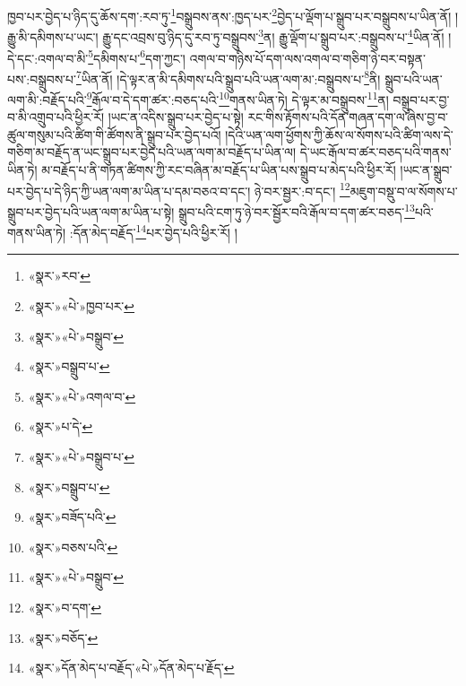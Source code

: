 ཁྱབ་པར་བྱེད་པ་ཉིད་དུ་ཆོས་དག་:རབ་ཏུ་\footnote{«སྣར་»རབ་}བསྒྲུབས་ནས་:ཁྱད་པར་\footnote{«སྣར་»«པེ་»ཁྱབ་པར་}བྱེད་པ་ལྡོག་པ་སྒྲུབ་པར་བསྒྲུབས་པ་ཡིན་ནོ། །རྒྱུ་མི་དམིགས་པ་ཡང་། རྒྱུ་དང་འབྲས་བུ་ཉིད་དུ་རབ་ཏུ་བསྒྲུབས་\footnote{«སྣར་»«པེ་»བསྒྲུབ་}ན། རྒྱུ་ལྡོག་པ་སྒྲུབ་པར་:བསྒྲུབས་པ་\footnote{«སྣར་»བསྒྲུབ་པ་}ཡིན་ནོ། །དེ་དང་:འགལ་བ་མི་\footnote{«སྣར་»«པེ་»འགལ་བ་}དམིགས་པ་\footnote{«སྣར་»པ་དེ་}དག་ཀྱང་། འགལ་བ་གཉིས་པོ་དག་ལས་འགལ་བ་གཅིག་ཉེ་བར་བསྟན་པས་:བསྒྲུབས་པ་\footnote{«སྣར་»«པེ་»བསྒྲུབ་པ་}ཡིན་ནོ། །དེ་ལྟར་ན་མི་དམིགས་པའི་སྒྲུབ་པའི་ཡན་ལག་མ་:བསྒྲུབས་པ་\footnote{«སྣར་»བསྒྲུབ་པ་}ནི། སྒྲུབ་པའི་ཡན་ལག་མི་:བརྗོད་པའི་\footnote{«སྣར་»བཟོད་པའི་}རྒོལ་བ་དེ་དག་ཚར་:བཅད་པའི་\footnote{«སྣར་»བཅས་པའི་}གནས་ཡིན་ཏེ། དེ་ལྟར་མ་བསྒྲུབས་\footnote{«སྣར་»«པེ་»བསྒྲུབ་}ན། བསྒྲུབ་པར་བྱ་བ་མི་འགྲུབ་པའི་ཕྱིར་རོ། །ཡང་ན་འདིས་སྒྲུབ་པར་བྱེད་པ་སྟེ། རང་གིས་རྟོགས་པའི་དོན་གཞན་དག་ལ་ཞེས་བྱ་བ་ཚུལ་གསུམ་པའི་ཚིག་གི་ཚོགས་ནི་སྒྲུབ་པར་བྱེད་པའོ། །དེའི་ཡན་ལག་ཕྱོགས་ཀྱི་ཆོས་ལ་སོགས་པའི་ཚིག་ལས་དེ་གཅིག་མ་བརྗོད་ན་ཡང་སྒྲུབ་པར་བྱེད་པའི་ཡན་ལག་མ་བརྗོད་པ་ཡིན་ལ། དེ་ཡང་རྒོལ་བ་ཚར་བཅད་པའི་གནས་ཡིན་ཏེ། མ་བརྗོད་པ་ནི་གཏན་ཚིགས་ཀྱི་རང་བཞིན་མ་བརྗོད་པ་ཡིན་པས་སྒྲུབ་པ་མེད་པའི་ཕྱིར་རོ། །ཡང་ན་སྒྲུབ་པར་བྱེད་པ་དེ་ཉིད་ཀྱི་ཡན་ལག་མ་ཡིན་པ་དམ་བཅའ་བ་དང་། ཉེ་བར་སྦྱར་:བ་དང་། \footnote{«སྣར་»བ་དག་}མཇུག་བསྡུ་བ་ལ་སོགས་པ་སྒྲུབ་པར་བྱེད་པའི་ཡན་ལག་མ་ཡིན་པ་སྟེ། སྒྲུབ་པའི་ངག་ཏུ་ཉེ་བར་སྦྱོར་བའི་རྒོལ་བ་དག་ཚར་བཅད་\footnote{«སྣར་»བཅོད་}པའི་གནས་ཡིན་ཏེ། :དོན་མེད་བརྗོད་\footnote{«སྣར་»དོན་མེད་པ་བརྗོད་«པེ་»དོན་མེད་པ་རྗོད་}པར་བྱེད་པའི་ཕྱིར་རོ། །
